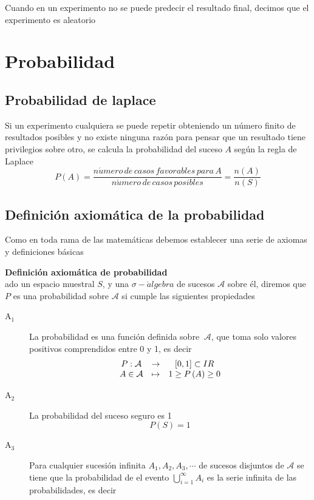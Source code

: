 Cuando en un experimento no se puede predecir el resultado final, decimos que
el experimento es aleatorio

\section{Probabilidad}

\subsection{Probabilidad de laplace}

Si un experimento cualquiera se puede repetir obteniendo un n\'{u}mero finito
de resultados posibles y no existe ninguna raz\'{o}n para pensar que un
resultado tiene privilegios sobre otro, se calcula la probabi\-lidad del
suceso $A$ seg\'{u}n la regla de Laplace
\[
P\left(  A\right)  =\frac{n\acute{u}mero\,de\,casos\,favorables\,para\,A}%
{n\acute{u}mero\,de\,casos\,posibles}=\frac{n\left(  A\right)  }{n\left(
S\right)  }%
\]

\subsection{Definici\'{o}n axiom\'{a}tica de la probabilidad}

Como en toda rama de las matem\'{a}ticas debemos establecer una serie de
axiomas y definiciones b\'{a}sicas%

\begin{definition}
\textbf{Definici\'{o}n axiom\'{a}tica de probabilidad}\\[D]ado un espacio
muestral $S$, y una $\sigma-\acute{a}lgebra$ de sucesos $\mathcal{A}$ sobre
\'{e}l, diremos que $P$ es una probabilidad sobre $\mathcal{A}$ si cumple las
siguientes propiedades
\begin{description}
\item[A$_{1}$] La probabilidad es una funci\'{o}n definida sobre
$\ \mathcal{A}$, que toma solo valores positivos comprendidos entre 0 y 1, es
decir \[
\begin{array}
[c]{ccc}
P:\mathcal{A} & \rightarrow& [0,1]\subset IR\\ A\in\mathcal{A} & \mapsto&
1\geq P\left(   A\right)   \geq0
\end{array}
\]   \item[A$_{2}$] La probabilidad del suceso seguro es 1 \[ P\left(
S\right)   =1 \]   \item[A$_{3}$] Para cualquier sucesi\'{o}n infinita
$A_{1},A_{2},A_{3},\cdots$ de sucesos disjuntos de $\mathcal{A}$ se tiene que
la probabilidad de el evento $\bigcup_{i=1}^{\infty}A_{i}$ es la serie
infinita de las probabilidades, es decir
\end{description}
\end{definition} %

